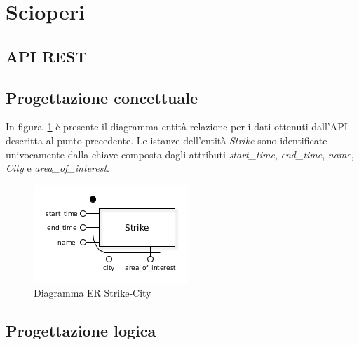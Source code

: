 \section{Scioperi}

\subsection{API REST}

\subsection{Progettazione concettuale}

In figura~\ref{fig:strikes_er} è presente il diagramma entità relazione per i dati
ottenuti dall'API descritta al punto precedente.
Le istanze dell'entità \textit{Strike} sono identificate univocamente dalla chiave composta
dagli attributi \textit{start\_time}, \textit{end\_time}, \textit{name}, \textit{City} e
\textit{area\_of\_interest}.

\begin{figure}                                                                                                                                                            
\centering                                                                                                                                                                   
\includegraphics{diagrams/strikes_er}                                                                                                                                   
\caption{Diagramma ER Strike-City}                                                                                                                                            
\label{fig:strikes_er}                                                                                                                                                           
\end{figure}

\subsection{Progettazione logica}

